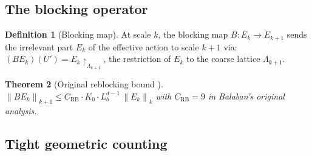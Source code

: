 \documentclass[11pt,a4paper]{amsart}
\newtheorem{theorem}{Theorem}[section]
\theoremstyle{definition}
\newtheorem{definition}[theorem]{Definition}
\newcommand{\norm}[1]{\left\|#1\right\|}
\newcommand{\CRB}{C_{\mathrm{RB}}}
\begin{document}
\subsection{The blocking operator}

\begin{definition}[Blocking map]
At scale $k$, the blocking map $B: E_k \to E_{k+1}$ sends the irrelevant
part $E_k$ of the effective action to scale $k+1$ via:
$(BE_k)(U') = E_k\!\upharpoonright_{\Lambda_{k+1}}$,
the restriction of $E_k$ to the coarse lattice $\Lambda_{k+1}$.
\end{definition}

\begin{theorem}[Original reblocking bound {\cite[Prop.~3.1]{B89b}}]
\label{thm:RB_orig}
$\norm{BE_k}_{k+1} \le \CRB \cdot K_0 \cdot L_b^{d-1}\,\norm{E_k}_k$
with $\CRB = 9$ in Balaban's original analysis.
\end{theorem}

\subsection{Tight geometric counting}
\end{document}
